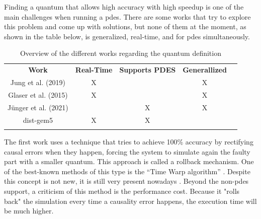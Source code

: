 Finding a quantum that allows high accuracy with high speedup is one of the main challenges when running a \gls{pdes}. There are some works 
that try to explore this problem and come up with solutions, but none of them at the moment, as shown in the table below, is generalized, 
real-time, and for \gls{pdes} simultaneously. 

\begin{table}[H]
\centering
\begin{tabular}{ccccl}
\cline{1-4}
\multicolumn{1}{|c|}{\cellcolor[HTML]{9B9B9B}\textbf{Work}} & \multicolumn{1}{c|}{\cellcolor[HTML]{9B9B9B}\textbf{Real-Time}} & \multicolumn{1}{c|}{\cellcolor[HTML]{9B9B9B}\textbf{Supports PDES}} & \multicolumn{1}{c|}{\cellcolor[HTML]{9B9B9B}\textbf{Generallized}} &  \\ \cline{1-4}
\multicolumn{1}{|c|}{Jung et al. \cite{optimist2} (2019)} & \multicolumn{1}{c|}{X} & \multicolumn{1}{c|}{} & \multicolumn{1}{c|}{X} &  \\ \cline{1-4}
\multicolumn{1}{|c|}{Glaser et al. \cite{GlaserTD} (2015)} & \multicolumn{1}{c|}{X} & \multicolumn{1}{c|}{} & \multicolumn{1}{c|}{X} &  \\ \cline{1-4}
\multicolumn{1}{|c|}{Jünger et al. \cite{optimizingTD} (2021)} & \multicolumn{1}{c|}{} & \multicolumn{1}{c|}{X} & \multicolumn{1}{c|}{X} &  \\ \cline{1-4}
\multicolumn{1}{|c|}{dist-gem5 \cite{dist-gem5}} & \multicolumn{1}{c|}{X} & \multicolumn{1}{c|}{X} & \multicolumn{1}{c|}{} &  \\ \cline{1-4}
\multicolumn{1}{l}{} & \multicolumn{1}{l}{} & \multicolumn{1}{l}{} & \multicolumn{1}{l}{} & 
\end{tabular}
\caption{Overview of the different works regarding the quantum definition}
\label{tab_OverviewDynamicQuantum}
\end{table}

The first work uses a technique that tries to achieve 100\% accuracy by rectifying causal errors when they happen, forcing the system to 
simulate again the faulty part with a smaller quantum. This approach is called a rollback mechanism. One of the best-known methods of this 
type is the “Time
Warp algorithm” \cite{jefferson1985virtual}. Despite this concept is not new, it is still very present nowadays \cite{busnot2020standard}. 
Beyond the non-\gls{pdes} support, a criticism of this method is the performance cost. Because it "rolls back" the simulation every time a 
causality error happens, the execution time will be much higher.

